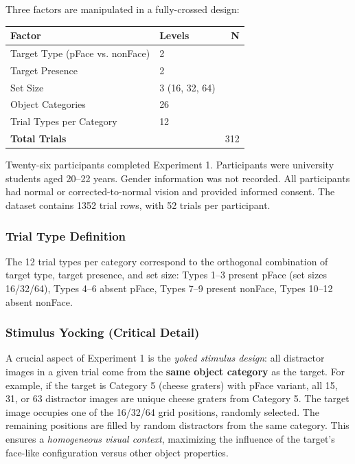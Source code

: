\documentclass[stu,12pt,floatsintext]{apa7}
\begin{document}
Three factors are manipulated in a fully-crossed design:

\begin{table}[H]
    \centering
    \begin{tabular}{llr}
        \toprule
        \textbf{Factor}                 & \textbf{Levels} & \textbf{N} \\
        \midrule
        Target Type (pFace vs. nonFace) & 2               &            \\
        Target Presence                 & 2               &            \\
        Set Size                        & 3 (16, 32, 64)  &            \\
        Object Categories               & 26              &            \\
        Trial Types per Category        & 12              &            \\
        \midrule
        \textbf{Total Trials}           &                 & 312        \\
        \bottomrule
    \end{tabular}
\end{table}

Twenty-six participants completed Experiment 1. Participants were university students aged 20–22 years. Gender information was not recorded. All participants had normal or corrected-to-normal vision and provided informed consent. The dataset contains 1352 trial rows, with 52 trials per participant.

\subsubsection{Trial Type Definition}

The 12 trial types per category correspond to the orthogonal combination of target type, target presence, and set size: Types 1--3 present pFace (set sizes 16/32/64), Types 4--6 absent pFace, Types 7--9 present nonFace, Types 10--12 absent nonFace.

\subsubsection{Stimulus Yocking (Critical Detail)}

A crucial aspect of Experiment 1 is the \textit{yoked stimulus design}: all distractor images in a given trial come from the \textbf{same object category} as the target. For example, if the target is Category 5 (cheese graters) with pFace variant, all 15, 31, or 63 distractor images are unique cheese graters from Category 5. The target image occupies one of the 16/32/64 grid positions, randomly selected. The remaining positions are filled by random distractors from the same category. This ensures a \textit{homogeneous visual context}, maximizing the influence of the target's face-like configuration versus other object properties.
\end{document}

